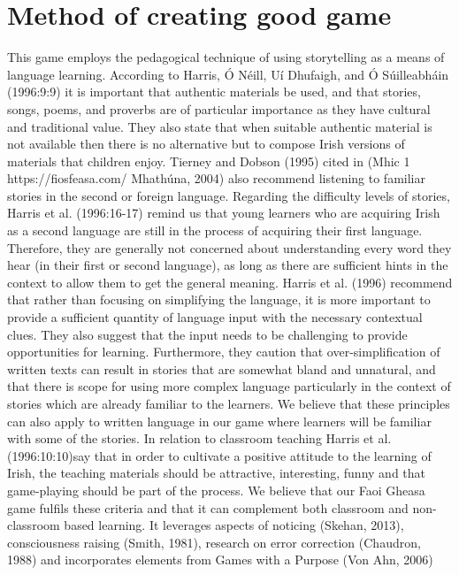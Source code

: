 \documentclass[10pt,twoside,english,a4paper]{article}
\begin{document}
\section{Method of creating good game }
This game employs the pedagogical technique of using storytelling as a means of language learning. According to Harris, Ó Néill, Uí Dhufaigh, and Ó Súilleabháin (1996:9:9) it is important that authentic materials be used, and that stories, songs, poems, and proverbs are of particular importance as they have cultural and traditional value. They also state that when suitable authentic material is not available then there is no alternative but to compose Irish versions of materials that children enjoy. Tierney and Dobson (1995) cited in (Mhic 1 https://fiosfeasa.com/ Mhathúna, 2004) also recommend listening to familiar stories in the second or foreign language. Regarding the difficulty levels of stories, Harris et al. (1996:16-17) remind us that young learners who are acquiring Irish as a second language are still in the process of acquiring their first language. Therefore, they are generally not concerned about understanding every word they hear (in their first or second language), as long as there are sufficient hints in the context to allow them to get the general meaning. Harris et al. (1996) recommend that rather than focusing on simplifying the language, it is more important to provide a sufficient quantity of language input with the necessary contextual clues. They also suggest that the input needs to be challenging to provide opportunities for learning. Furthermore, they caution that over-simplification of written texts can result in stories that are somewhat bland and unnatural, and that there is scope for using more complex language particularly in the context of stories which are already familiar to the learners. We believe that these principles can also apply to written language in our game where learners will be familiar with some of the stories. In relation to classroom teaching Harris et al. (1996:10:10)say that in order to cultivate a positive attitude to the learning of Irish, the teaching materials should be attractive, interesting, funny and that game-playing should be part of the process. We believe that our Faoi Gheasa game fulfils these criteria and that it can complement both classroom and non-classroom based learning. It leverages aspects of noticing (Skehan, 2013), consciousness raising (Smith, 1981), research on error correction (Chaudron, 1988) and incorporates elements from Games with a Purpose (Von Ahn, 2006)\\
\end{document}

